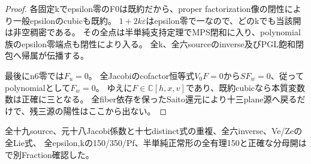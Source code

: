 \documentclass[a4paper,11pt]{ltjsarticle}
\theoremstyle{definition}
\begin{document}
\begin{proof}
各固定kでepsilon零のF0は既約だから、proper factorization像の閉性により一般epsilonのcubicも既約。
$1+2k\varepsilon$はepsilon零で一なので、どのkでも当該開は非空稠密である。
その全点は半単純支持定理でMPS閉和に入り、polynomial族のepsilon零端点も閉性により入る。
全k、全六sourceのinverse及びPGL飽和閉包へ帰属が伝播する。

最後にn6零では$F_u=0$。
全Jacobiのcofactor恒等式$V_0F=0$から$SF_w=0$、従ってpolynomialとして$F_w=0$。
ゆえに$F\in\mathbb C[h,x,v]$であり、既約cubicなら本質変数数は正確に三となる。
全fiber依存を保ったSaito還元により十三plane源へ戻るだけで、残三源の陽性はここから出ない。
\end{proof}
全十九source、元十八Jacobi係数と十七distinct式の重複、全六inverse、Ve/Zeの全Lie式、
全epsilon,kの150/350/Pf、半単純正常形の全有理150と正確な分母開は
で別Fraction確認した。
\end{document}
